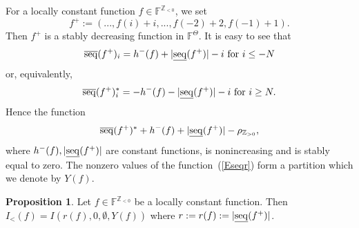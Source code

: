 \documentclass[10pt]{amsart}\oddsidemargin -1mm \evensidemargin -1mm \topmargin -15mm\headheight5mm \headsep 3.5mm \textheight 245mm\textwidth 170mm
\theoremstyle{definition}\newtheorem{theorem}{Theorem}[section]\newtheorem{lemma}[theorem]{Lemma}\newtheorem{remark}[theorem]{Remark}\newtheorem{proposition}[theorem]{Proposition}\newtheorem{corollary}[theorem]{Corollary}\newtheorem{definition}[theorem]{Definition}\newtheorem{Ex}[theorem]{Example}\newtheorem{obs}[theorem]{Observation}\newtheorem{nota}[theorem]{Notation}
\begin{document}
For a locally constant function $f\in\mathbb F^{\mathbb Z_{<0}}$, we set 
$$f^+:=(..., f(i)+i,..., f(-2)+2, f(-1)+1).$$
Then $f^+$ is a stably decreasing function in $\mathbb F^\Theta$. 
It is easy to see that $${\rm\overline{seq}}(f^+)_i=h^-(f)+|{\rm\underline{seq}}(f^+)|-i{\rm~for~}i\le -N$$
or, equivalently, $${\rm\overline{seq}}(f^+)^*_i=-h^-(f)-|{\rm\underline{seq}}(f^+)|-i{\rm~for~}i\ge N.$$
Hence the function\begin{equation}{\rm\overline{seq}}(f^+)^*+h^-(f)+|{\rm\underline{seq}}(f^+)|-\rho_{\mathbb Z_{>0}}\label{Eseqr},\end{equation}
where $h^-(f), |{\rm\underline{seq}}(f^+)|$ are constant functions, is nonincreasing and is stably equal to zero. 
The nonzero values of the function~(\ref{Eseqr}) form a partition which we denote by ${Y}(f)$.
\begin{proposition}\label{Prsz-}Let $f\in\mathbb F^{\mathbb Z_{<0}}$ be a locally constant function. 
Then $I_<(f)=I(r(f), 0, \emptyset, {Y}(f))$ where $r:=r(f):=|{\rm\underline{seq}}(f^+)|$.
\end{proposition}
\end{document}
